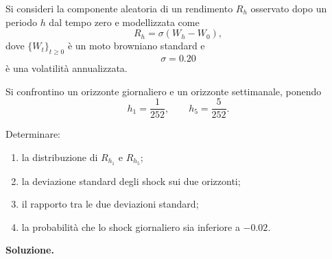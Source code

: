 \begin{exercise}
\label{ex:cap06-scala-shock-browniani}

Si consideri la componente aleatoria di un rendimento $R_h$ osservato dopo un periodo $h$ dal tempo zero e modellizzata
come
\[
R_h=\sigma(W_h-W_0),
\]
dove $\{W_t\}_{t\geq 0}$ \`{e} un moto browniano standard e
\[
\sigma=0.20
\]
\`{e} una volatilit\`{a} annualizzata.

Si confrontino un orizzonte giornaliero e un orizzonte settimanale,
ponendo
\[
h_1=\frac{1}{252},
\qquad
h_5=\frac{5}{252}.
\]

Determinare:

\begin{enumerate}
\item la distribuzione di $R_{h_1}$ e $R_{h_5}$;
\item la deviazione standard degli shock sui due orizzonti;
\item il rapporto tra le due deviazioni standard;
\item la probabilit\`{a} che lo shock giornaliero sia inferiore a
$-0.02$.
\end{enumerate}

\end{exercise}

\noindent
\textbf{Soluzione.}


